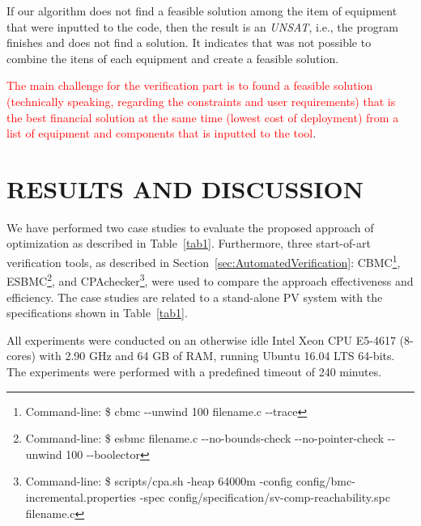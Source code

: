 \documentclass[10pt,conference]{IEEEtran}
\begin{document}
If our algorithm does not find a feasible solution among the item of equipment that were inputted to the code, then the result is an \textit{UNSAT}, i.e., the program finishes and does not find a solution. It indicates that was not possible to combine the itens of each equipment and create a feasible solution.

\textcolor{red}{The main challenge for the verification part is to found a feasible solution (technically speaking, regarding the constraints and user requirements) that is the best financial solution at the same time (lowest cost of deployment) from a list of equipment and components that is inputted to the tool}.
\section{RESULTS AND DISCUSSION}
We have performed two case studies to evaluate the proposed approach of optimization as described in Table~\ref{tab1}. Furthermore, three start-of-art verification tools, as described in Section~\ref{sec:AutomatedVerification}: CBMC\footnote{Command-line: \$ cbmc -\phantom{}-unwind 100 filename.c -\phantom{}-trace}, ESBMC\footnote{Command-line: \$ esbmc filename.c -\phantom{}-no-bounds-check -\phantom{}-no-pointer-check -\phantom{}-unwind 100 -\phantom{}-boolector}, %
and CPAchecker\footnote{Command-line: \$ scripts/cpa.sh -heap 64000m -config config/bmc-incremental.properties -spec config/specification/sv-comp-reachability.spc filename.c}, were used to compare the approach effectiveness and efficiency. The case studies are related to a stand-alone PV system with the specifications shown in Table~\ref{tab1}.

All experiments were conducted on an otherwise idle Intel Xeon CPU E5-4617 (8-cores) with 2.90 GHz and 64 GB of RAM, running Ubuntu 16.04 LTS 64-bits. The experiments were performed with a predefined timeout of 240 minutes.
\end{document}

